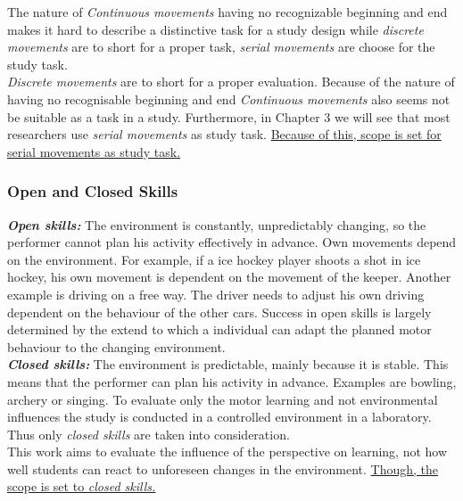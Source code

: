 The nature of \textit{Continuous movements} having no recognizable beginning and end makes it hard to describe a distinctive task for a study design while \textit{discrete movements} are to short for a proper task, \textit{serial movements} are choose for the study task.\\
\textit{Discrete movements} are to short for a proper evaluation. Because of the nature of having no recognisable beginning and end \textit{Continuous movements} also seems not be suitable as a task in a study. Furthermore, in Chapter 3 we will see that most researchers use \textit{serial movements} as study task. \underline{Because of this, scope is set for serial movements as study task.}

\subsubsection{Open and Closed Skills}
\textit{\textbf{Open skills:}} The environment is constantly, unpredictably changing, so the performer cannot plan his activity effectively in advance. Own movements depend on the environment. For example, if a ice hockey player shoots a shot in ice hockey, his own movement is dependent on the movement of the keeper. Another example is  driving on a free way. The driver needs to adjust his own driving dependent on the behaviour of the other cars. Success in open skills is largely determined by the extend to which a individual can adapt the planned motor behaviour to the changing environment.\\
\textit{\textbf{Closed skills:}} The environment is predictable, mainly because it is stable. This means that the performer can plan his activity in advance. Examples are bowling, archery or singing. To evaluate only the motor learning and not environmental influences the study is conducted in a controlled environment in a laboratory. Thus only \textit{closed skills} are taken into consideration.\\
This work aims to evaluate the influence of the perspective on learning, not how well students can react to unforeseen changes in the environment. \ul{Though, the scope is set to \textit{closed skills.}}

